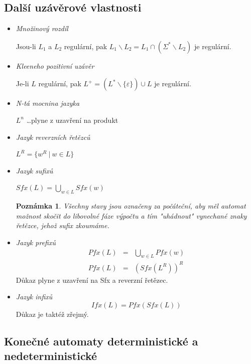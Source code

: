 \documentclass[10pt,a4paper]{article}
\theoremstyle{note}
\newtheorem{poznamka}{Poznámka}
\begin{document}
\subsection{Další uzávěrové vlastnosti}

\begin{itemize}

\item
\textit{Množinový rozdíl}

Jsou-li $L_1$ a $L_2$ regulární, pak $L_1 \backslash L_2 = L_1 \cap (\Sigma^* \backslash L_2)$ je regulární.

\item
\textit{Kleeneho pozitivní uzávěr}

Je-li $L$ regulární, pak $L^+ = (L^* \backslash \lbrace \varepsilon \rbrace) \cup L$ je regulární.

\item
\textit{N-tá mocnina jazyka}

$L^n$ \ldots plyne z uzavření na produkt

\item
\textit{Jazyk reverzních řetězců}

$L^R = \lbrace w^R \ |\ w \in L \rbrace$



\item
\textit{Jazyk sufixů}

$Sfx(L) = \bigcup_{w \in L} Sfx(w)$


\begin{poznamka}
Všechny stavy jsou označeny za počáteční, aby měl automat možnost skočit do libovolné fáze výpočtu a tím "uhádnout" vynechané znaky řetězce, jehož sufix zkoumáme.
\end{poznamka}

\item
\textit{Jazyk prefixů}
\begin{eqnarray*}
Pfx(L) &=& \bigcup_{w \in L} Pfx(w) \\
Pfx(L) &=& (Sfx(L^R))^R
\end{eqnarray*}
Důkaz plyne z uzavření na Sfx a reverzní řetězec.

\item
\textit{Jazyk infixů}
$$
Ifx(L) = Pfx(Sfx(L))
$$
Důkaz je taktéž zřejmý.
\end{itemize}



	\subsection{Konečné automaty deterministické a nedeterministické}
\end{document}
